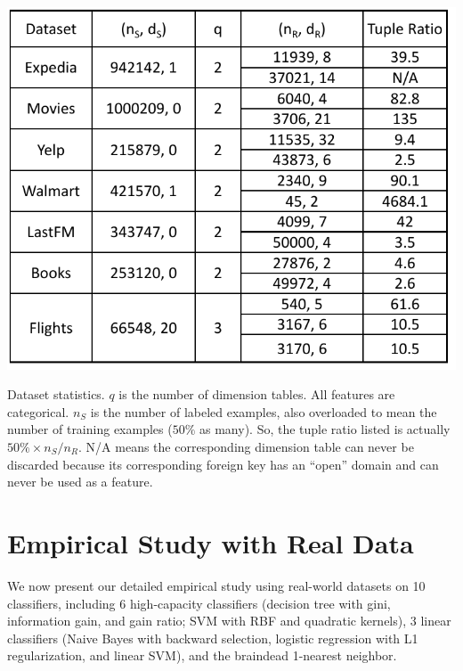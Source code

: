 \documentclass{vldb}
\begin{document}
\begin{table}[t]
\centering
\includegraphics[width=0.99\linewidth]{table1.pdf}
\caption{Dataset statistics. $q$ is the number of dimension tables. All features are categorical. $n_S$ is the number of labeled examples, also 
overloaded to mean the number of training examples ($50\%$ as many). So, the tuple ratio listed is actually $50\% \times n_S / n_R$. N/A means the 
corresponding dimension table can never be discarded because its corresponding foreign key has an ``open'' domain and can never be used as a feature.
}
\label{Table:datastats}
\end{table}


\section{Empirical Study with Real Data}

We now present our detailed empirical study using real-world datasets on 10 classifiers, including 6 high-capacity classifiers (decision tree with gini, 
information gain, and gain ratio; SVM with RBF and quadratic kernels), 3 linear classifiers (Naive Bayes with backward selection, logistic regression with
L1 regularization, and linear SVM), and the braindead 1-nearest neighbor.
\end{document}
